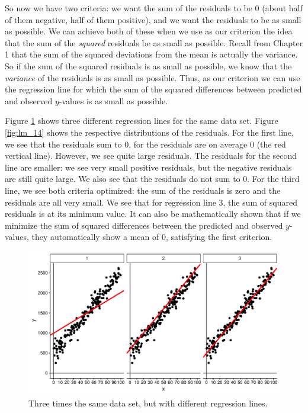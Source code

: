 \documentclass[]{book}\usepackage[]{graphicx}\usepackage[]{color}
\makeatletter
\def\maxwidth{ %
  \ifdim\Gin@nat@width>\linewidth
    \linewidth
  \else
    \Gin@nat@width
  \fi
}
\newenvironment{knitrout}{}{} %
\makeatother
\begin{document}
So now we have two criteria: we want the sum of the residuals to be 0 (about half of them negative, half of them positive), and we want the residuals to be as small as possible. We can achieve both of these when we use as our criterion the idea that the sum of the \textit{squared} residuals be as small as possible. Recall from Chapter 1 that the sum of the squared deviations from the mean is actually the variance. So if the sum of the squared residuals is as small as possible, we know that the \textit{variance} of the residuals is as small as possible. Thus, as our criterion we can use the regression line for which the sum of the squared differences between predicted and observed $y$-values is as small as possible. 

Figure \ref{fig:lm_13} shows three different regression lines for the same data set. Figure \ref{fig:lm_14} shows the respective distributions of the residuals. For the first line, we see that the residuals sum to 0, for the residuals are on average 0 (the red vertical line). However, we see quite large residuals. The residuals for the second line are smaller: we see very small positive residuals, but the negative residuals are still quite large. We also see that the residuals do not sum to 0. For the third line, we see both criteria optimized: the sum of the residuals is zero and the residuals are all very small. We see that for regression line 3, the sum of squared residuals is at its minimum value. It can also be mathematically shown that if we minimize the sum of squared differences between the predicted and observed $y$-values, they automatically show a mean of 0, satisfying the first criterion.



\begin{knitrout}
\color{fgcolor}\begin{figure}

{\centering \includegraphics[width=\maxwidth]{figure/lm_13-1} 

}

\caption[Three times the same data set, but with different regression lines]{Three times the same data set, but with different regression lines.}\label{fig:lm_13}
\end{figure}


\end{knitrout}
\end{document}
